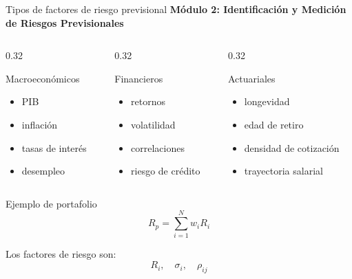 \documentclass[10pt,aspectratio=169]{beamer}
\begin{document}
\begin{frame}{Tipos de factores de riesgo previsional}
\textbf{Módulo 2: Identificación y Medición de Riesgos Previsionales}

\begin{columns}[T]

\begin{column}{0.32\textwidth}
\begin{block}{Macroeconómicos}
\begin{itemize}
    \item PIB
    \item inflación
    \item tasas de interés
    \item desempleo
\end{itemize}
\end{block}
\end{column}

\begin{column}{0.32\textwidth}
\begin{block}{Financieros}
\begin{itemize}
    \item retornos
    \item volatilidad
    \item correlaciones
    \item riesgo de crédito
\end{itemize}
\end{block}
\end{column}

\begin{column}{0.32\textwidth}
\begin{block}{Actuariales}
\begin{itemize}
    \item longevidad
    \item edad de retiro
    \item densidad de cotización
    \item trayectoria salarial
\end{itemize}
\end{block}
\end{column}

\end{columns}


\begin{exampleblock}{Ejemplo de portafolio}
\[
R_p = \sum_{i=1}^{N} w_i R_i
\]

Los factores de riesgo son:
\[
R_i,\quad \sigma_i,\quad \rho_{ij}
\]
\end{exampleblock}

\end{frame}
\end{document}
